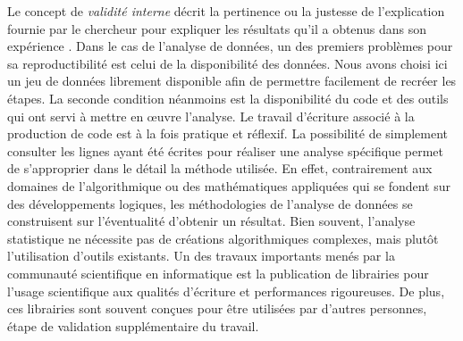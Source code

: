 Le concept de \textit{validité interne} décrit la pertinence ou la justesse de l'explication fournie par le chercheur pour expliquer les résultats qu'il a obtenus dans son expérience \citep{Yin2009a}. Dans le cas de l'analyse de données, un des premiers problèmes pour sa reproductibilité est celui de la disponibilité des données. Nous avons choisi ici un jeu de données librement disponible afin de permettre facilement de recréer les étapes. La seconde condition néanmoins est la disponibilité du code et des outils qui ont servi à mettre en œuvre l'analyse. Le travail d'écriture associé à la production de code est à la fois pratique et réflexif. La possibilité de simplement consulter les lignes ayant été écrites pour réaliser une analyse spécifique permet de s'approprier dans le détail la méthode utilisée. En effet, contrairement aux domaines de l'algorithmique ou des mathématiques appliquées qui se fondent sur des développements logiques, les méthodologies de l'analyse de données se construisent sur l'éventualité d'obtenir un résultat. Bien souvent, l'analyse statistique ne nécessite pas de créations algorithmiques complexes, mais plutôt l'utilisation d'outils existants. Un des travaux importants menés par la communauté scientifique en informatique est la publication de librairies pour l'usage scientifique aux qualités d'écriture et performances rigoureuses. De plus, ces librairies sont souvent conçues pour être utilisées par d'autres personnes, étape de validation supplémentaire du travail. 

